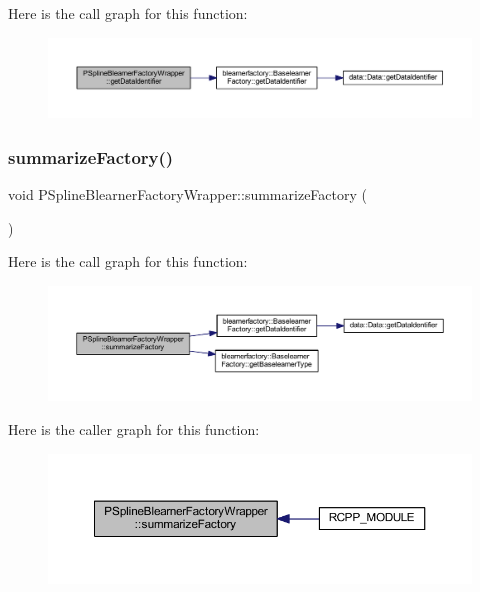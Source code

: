 Here is the call graph for this function\+:\nopagebreak
\begin{figure}[H]
\begin{center}
\leavevmode
\includegraphics[width=350pt]{class_p_spline_blearner_factory_wrapper_a909646ea1efe420d71c8159ab2305fc8_cgraph}
\end{center}
\end{figure}
\mbox{\label{class_p_spline_blearner_factory_wrapper_a930b000d5fad67c58bade22c7cd54149}} 
\subsubsection{\texorpdfstring{summarize\+Factory()}{summarizeFactory()}}
{\footnotesize\ttfamily void P\+Spline\+Blearner\+Factory\+Wrapper\+::summarize\+Factory (\begin{DoxyParamCaption}{ }\end{DoxyParamCaption})\hspace{0.3cm}{\ttfamily [inline]}}

Here is the call graph for this function\+:\nopagebreak
\begin{figure}[H]
\begin{center}
\leavevmode
\includegraphics[width=350pt]{class_p_spline_blearner_factory_wrapper_a930b000d5fad67c58bade22c7cd54149_cgraph}
\end{center}
\end{figure}
Here is the caller graph for this function\+:\nopagebreak
\begin{figure}[H]
\begin{center}
\leavevmode
\includegraphics[width=350pt]{class_p_spline_blearner_factory_wrapper_a930b000d5fad67c58bade22c7cd54149_icgraph}
\end{center}
\end{figure}


